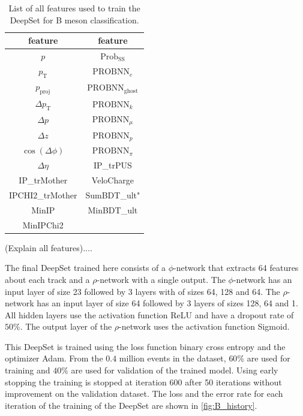 \begin{table}
    \centering
    \caption{List of all features used to train the DeepSet for B meson classification.}
    \label{tab:B_features}
    \begin{tabular}{c c}
        \toprule
        feature & feature \\
        \midrule
        $p$                 & $\text{Prob}_\text{SS}$ \\ %
        $p_\text{T}$        & $\text{PROBNN}_e$ \\ %
        $p_\text{proj}$     & $\text{PROBNN}_\text{ghost}$ \\ %
        $\Delta p_\text{T}$ & $\text{PROBNN}_k$ \\ %
        $\Delta p$          & $\text{PROBNN}_\mu$ \\ %
        $\Delta z$          & $\text{PROBNN}_p$ \\ %
        $\cos(\Delta \phi)$ & $\text{PROBNN}_\pi$ \\ %
        $\Delta \eta$       & IP\_trPUS \\ %
        IP\_trMother        & VeloCharge \\ %
        IPCHI2\_trMother    & SumBDT\_ult" \\ %
        MinIP               & MinBDT\_ult \\ %
        MinIPChi2           & \\ %
        \bottomrule
    \end{tabular}
\end{table}

(Explain all features)....

The final DeepSet trained here consists of a $\phi$-network that extracts 64 features about each track and a $\rho$-network with a single output.
The $\phi$-network has an input layer of size 23 followed by 3 layers with of sizes 64, 128 and 64.
The $\rho$-network has an input layer of size 64 followed by 3 layers of sizes 128, 64 and 1.
All hidden layers use the activation function ReLU and have a dropout rate of $50\%$.
The output layer of the $\rho$-network uses the activation function Sigmoid.

This DeepSet is trained using the loss function binary cross entropy and the optimizer Adam.
From the $0.4$ million events in the dataset, $60\%$ are used for training and $40\%$ are used for validation of the trained model.
Using early stopping the training is stopped at iteration 600 after 50 iterations without improvement on the validation dataset.
The loss and the error rate for each iteration of the training of the DeepSet are shown in \autoref{fig:B_history}.


